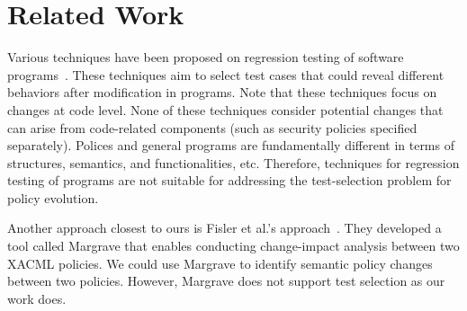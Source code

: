 \section{Related Work}
\label{sec:related}


Various techniques have been proposed on regression testing of software programs~\cite{Rothermel:1996:ART:235681.235682, Graves:2001:ESR:367008.367020}.
These techniques aim to select test cases that could reveal different behaviors after modification
in programs.
Note that these techniques focus on changes at code level.
None of these techniques consider potential changes that can arise from code-related components (such as security policies specified separately).
Polices and general programs are fundamentally different in terms of structures, semantics, and
functionalities, etc. Therefore, techniques for regression
testing of programs are not suitable for addressing 
the test-selection problem for policy evolution.

Another approach closest to ours is Fisler et al.'s
approach~\cite{fisler05:verification}.
They developed a tool called Margrave that enables conducting change-impact analysis between two XACML
policies. We could use Margrave to identify semantic policy changes
between two policies.
However, Margrave does not support test selection as our work does.




